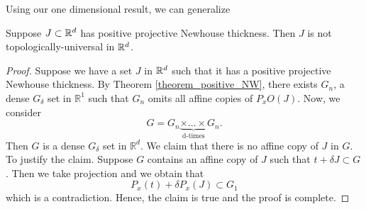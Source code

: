 
Using our one dimensional result, we can generalize 
\begin{theorem}Suppose $J \subset \mathbb{R}^d$ has positive projective Newhouse thickness. Then $J$ is not topologically-universal in $\mathbb{R}^d$.  
\end{theorem}

\begin{proof}  Suppose we have a set $J$ in $\mathbb{R}^d$ such that it has a positive projective Newhouse thickness.  By Theorem \ref{theorem_positive_NW}, there exists $G_n$, a dense $G_{\delta}$ set in ${\mathbb R}^1$ such that $G_n$ omits all affine copies of $P_x O(J)$. Now, we consider 
$$
G = G_n\underbrace{\times \dots \times}_\text{d-times} G_n. 
$$
Then $G$ is a dense $G_{\delta}$ set in ${\mathbb R}^d$. We claim that there is no affine copy of $J$ in $G$. To justify the claim. Suppose $G$ contains an affine copy of $J$ such that $t+\delta J\subset G$.  Then we take projection and we obtain that
$$
P_x(t)+ \delta P_x (J) \subset G_1
$$
which is a contradiction. Hence, the claim is true and the proof is complete. 





\end{proof}